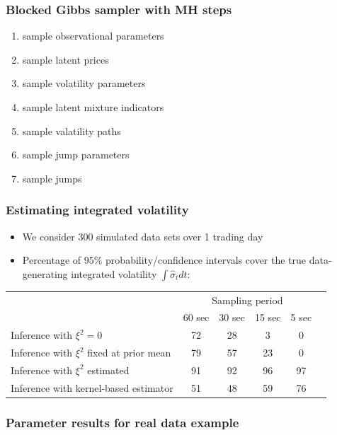 \documentclass{beamer}
\begin{document}
\begin{frame}
  \frametitle{Blocked Gibbs sampler with MH steps}
  \begin{enumerate}
  \item sample observational parameters
  \item sample latent prices
  \item sample volatility parameters
  \item sample latent mixture indicators
  \item sample valatility paths
  \item sample jump parameters
  \item sample jumps
  \end{enumerate}
\end{frame}
\begin{frame}
  \frametitle{Estimating integrated volatility}
  \begin{itemize}
    \item We consider 300 simulated data sets over 1 trading day
  
    \item Percentage of $95\%$ probability/confidence intervals
      cover the true data-generating integrated volatility
      $\int \hat{\sigma}_t dt$:
  \end{itemize}
  \begin{table}[h]
\begin{center}
  \begin{tabular}{|l|ccccc|}
    \hline
    & \multicolumn{4}{c|}{Sampling period} \\
    &   	60 sec 	&   30 sec   &   15 sec & 5 sec  \\ \hline \hline
    Inference with $\xi^2 = 0$   &  72  &   28  &	 3 & 0 \\
    Inference with $\xi^2$ fixed at prior mean &  79 & 57 & 23 & 0 \\
    Inference with $\xi^2$ estimated & 91 & 92 & 96 & 97  \\ \hline
    Inference with kernel-based estimator &  51 & 48 & 59  & 76 \\
    \hline
\end{tabular}
\end{center}
\end{table}
\end{frame}
\begin{frame}
  \frametitle{Parameter results for real data example}
\end{frame}
\end{document}
